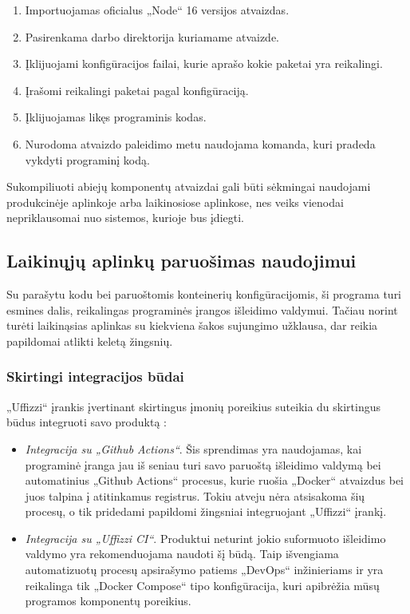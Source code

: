 \documentclass{VUMIFPSkursinis}
\begin{document}
\begin{enumerate}
  \item Importuojamas oficialus „Node“ 16 versijos atvaizdas.
  \item Pasirenkama darbo direktorija kuriamame atvaizde.
  \item Įklijuojami konfigūracijos failai, kurie aprašo kokie paketai yra reikalingi.
  \item Įrašomi reikalingi paketai pagal konfigūraciją.
  \item Įklijuojamas likęs programinis kodas.
  \item Nurodoma atvaizdo paleidimo metu naudojama komanda, kuri pradeda vykdyti programinį kodą.
\end{enumerate}

Sukompiliuoti abiejų komponentų atvaizdai gali būti sėkmingai naudojami produkcinėje aplinkoje arba laikinosiose aplinkose, nes veiks vienodai nepriklausomai nuo sistemos, kurioje bus įdiegti.

\subsection{Laikinųjų aplinkų paruošimas naudojimui}

Su parašytu kodu bei paruoštomis konteinerių konfigūracijomis, ši programa turi esmines dalis, reikalingas programinės įrangos išleidimo valdymui. Tačiau norint turėti laikinąsias aplinkas su kiekviena šakos sujungimo užklausa, dar reikia papildomai atlikti keletą žingsnių.

    \subsubsection{Skirtingi integracijos būdai}

„Uffizzi“ įrankis įvertinant skirtingus įmonių poreikius suteikia du skirtingus būdus integruoti savo produktą \cite{SaltKeturioliktas}:

\begin{itemize}
  \item \textit{Integracija su „Github Actions“}. Šis sprendimas yra naudojamas, kai programinė įranga jau iš seniau turi savo paruoštą išleidimo valdymą bei automatinius „Github Actions“ procesus, kurie ruošia „Docker“ atvaizdus bei juos talpina į atitinkamus registrus. Tokiu atveju nėra atsisakoma šių procesų, o tik pridedami papildomi žingsniai integruojant „Uffizzi“ įrankį.

  \item \textit{Integracija su „Uffizzi CI“}. Produktui neturint jokio suformuoto išleidimo valdymo yra rekomenduojama naudoti šį būdą. Taip išvengiama automatizuotų procesų apsirašymo patiems „DevOps“ inžinieriams ir yra reikalinga tik „Docker Compose“ tipo konfigūracija, kuri apibrėžia mūsų programos komponentų poreikius.


\end{itemize}
    
\end{document}
